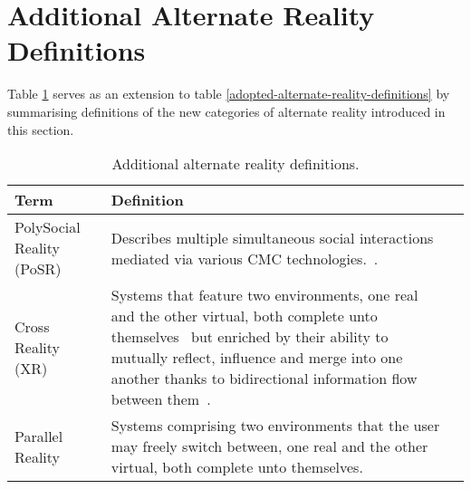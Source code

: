 
\section{Additional Alternate Reality Definitions}
\label{summaryofadditionalalternaterealitydefinitions}

Table \ref{additional-alternate-reality-definitions} serves as an extension to table \ref{adopted-alternate-reality-definitions} by summarising definitions of the new categories of alternate reality introduced in this section.

\begin{table}[h]
\begin{center}
\begin{tabularx}{\textwidth}{l *{2}{>{\centering\arraybackslash}X}}

\toprule

\textbf{Term} & \textbf{Definition} \\

\midrule

		
PolySocial Reality (PoSR) & Describes multiple simultaneous social interactions mediated via various CMC technologies.~\cite{Applin2012}. \\

\midrule


Cross Reality (XR) & Systems that feature two environments, one real and the other virtual, both complete unto themselves~\cite{lifton:merging} but enriched by their ability to mutually reflect, influence and merge into one another thanks to bidirectional information flow between them~\cite{kim:practical}. \\

\midrule


Parallel Reality & Systems comprising two environments that the user may freely switch between, one real and the other virtual, both complete unto themselves. \\


\bottomrule
\end{tabularx}
\end{center}
\caption{Additional alternate reality definitions.}
\label{additional-alternate-reality-definitions}
\end{table}

